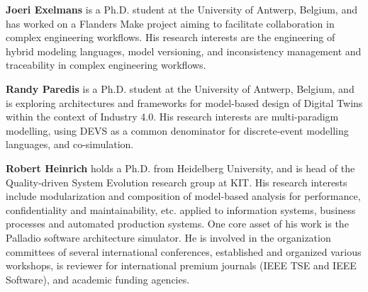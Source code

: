 \medskip
\noindent
\textbf{Joeri Exelmans} is a Ph.D. student at the University of Antwerp, Belgium, and has worked on a Flanders Make project aiming to facilitate collaboration in complex engineering workflows. His research interests are the engineering of hybrid modeling languages, model versioning, and inconsistency management and traceability in complex engineering workflows.

\medskip
\noindent
\textbf{Randy Paredis} is a Ph.D. student at the University of Antwerp, Belgium, and is exploring architectures and frameworks for model-based design of Digital Twins within the context of Industry 4.0. His research interests are multi-paradigm modelling, using DEVS as a common denominator for discrete-event modelling languages, and co-simulation.


\medskip
\noindent
\textbf{Robert Heinrich} holds a Ph.D. from Heidelberg University, and is head of the Quality-driven System Evolution research group at KIT. His research interests include modularization
and composition of model-based analysis for performance, confidentiality and maintainability, etc. applied to information systems, business processes and automated production systems. One core asset of his work is the Palladio software architecture simulator. He is involved in the organization committees of several international conferences, established and organized various workshops, is reviewer for international premium journals (IEEE TSE and IEEE Software), and academic funding agencies.

